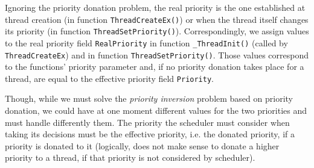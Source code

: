 Ignoring the priority donation problem, the real priority is the one established at thread creation (in function \lstinline|ThreadCreateEx()|) or when the thread itself changes its priority (in function \lstinline|ThreadSetPriority()|). Correspondingly, we assign values to the real priority field \lstinline|RealPriority| in function \lstinline|_ThreadInit()| (called by \lstinline|ThreadCreateEx|) and in function \lstinline|ThreadSetPriority()|. Those values correspond to the functions' priority parameter and, if no priority donation takes place for a thread, are equal to the effective priority field \lstinline|Priority|.

Though, while we must solve the \textit{priority inversion} problem based on priority donation, we could have at one moment different values for the two priorities and must handle differently them. The priority the scheduler must consider when taking its decisions must be the effective priority, i.e. the donated priority, if a priority is donated to it (logically, does not make sense to donate a higher priority to a thread, if that priority is not considered by scheduler). 

